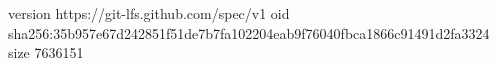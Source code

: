 version https://git-lfs.github.com/spec/v1
oid sha256:35b957e67d242851f51de7b7fa102204eab9f76040fbca1866c91491d2fa3324
size 7636151

